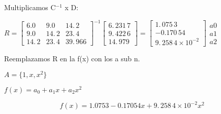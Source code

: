\documentclass{article}
\begin{document}
\bigskip

Multiplicamos C$^{-1}$ x D:

\bigskip $R=\left[ 
\begin{array}{ccc}
6.0 & 9.0 & 14.\,\allowbreak 2 \\ 
9.0 & 14.\,\allowbreak 2 & 23.\,\allowbreak 4 \\ 
14.\,\allowbreak 2 & 23.\,\allowbreak 4 & 39.\,\allowbreak 966%
\end{array}%
\right] ^{-1}\left[ 
\begin{array}{c}
6.\,\allowbreak 231\,7 \\ 
9.\,\allowbreak 422\,6 \\ 
14.\,\allowbreak 979%
\end{array}%
\right] =\allowbreak \left[ 
\begin{array}{c}
1.\,\allowbreak 075\,3 \\ 
-0.170\,54 \\ 
9.\,\allowbreak 258\,4\times 10^{-2}%
\end{array}%
\right] \allowbreak 
\begin{array}{c}
a0 \\ 
a1 \\ 
a2%
\end{array}%
$

\bigskip Reemplazamos R en la f(x) con los a sub n.

$A=\{1,x,x^{2}\}$

$f(x)=a_{0}+a_{1}x+a_{2}x^{2}$

\[
f(x)=1.0753-0.17054x+9.\,\allowbreak 258\,4\times 10^{-2}x^{2} 
\]
\end{document}
